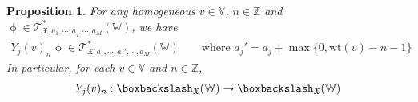 \documentclass[11pt,b5paper,notitlepage]{article}
\theoremstyle{definition}
\theoremstyle{plain}
\newtheorem{pp}[df]{Proposition}
\newtheorem{lm}[df]{Lemma}
\newcommand{\Vbb}{\mathbb V}
\newcommand{\Wbb}{\mathbb W}
\newcommand{\Zbb}{\mathbb Z}
\newcommand{\wt}{\mathrm{wt}}
\newcommand{\<}{\left\langle}
\renewcommand{\>}{\right\rangle}
\newcommand{\fx}{\mathfrak{X}}
\newcommand{\ST}{\mathscr{T}}
\numberwithin{equation}{section}
\begin{document}

\begin{pp}\label{lb19}
For any homogeneous $v\in \Vbb$, $n\in \Zbb$ and $\upphi\in \ST_{\fx,a_1,\cdots,a_j,\cdots,a_M}^*(\Wbb)$, we have
\begin{align*}
Y_j(v)_n\upphi\in \ST_{\fx,a_1,\cdots,a_j',\cdots,a_M}^*(\Wbb)\qquad\text{where }a_j'=a_j+\max\{0,\wt(v)-n-1\}
\end{align*}
In particular, for each $v\in \Vbb$ and $n\in \Zbb$, 
\begin{gather*}
        Y_j(v)_n:\boxbackslash_\fx(\Wbb)\rightarrow \boxbackslash_\fx(\Wbb)
\end{gather*}
    \end{pp}
\end{document}
